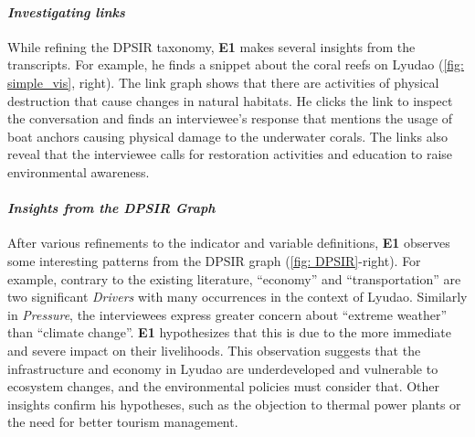 \vspace*{-0.12cm}
\paragraph{\textbf{\textit{Investigating links}}}
While refining the DPSIR taxonomy, \textbf{E1} makes several insights from the transcripts. For example, he finds a snippet about the coral reefs on Lyudao (\autoref{fig: simple_vis}, right). The link graph shows that there are activities of physical destruction that cause changes in natural habitats. He clicks the link to inspect the conversation and finds an interviewee's response that mentions the usage of boat anchors causing physical damage to the underwater corals. The links also reveal that the interviewee calls for restoration activities and education to raise environmental awareness. 

\vspace*{-0.12cm}
\paragraph{\textbf{\textit{Insights from the DPSIR Graph}}}
After various refinements to the indicator and variable definitions, \textbf{E1} observes some interesting patterns from the DPSIR graph (\autoref{fig: DPSIR}-right). For example, contrary to the existing literature, ``economy'' and ``transportation'' are two significant \textit{Drivers} with many occurrences in the context of Lyudao. Similarly in \textit{Pressure}, the interviewees express greater concern about ``extreme weather'' than ``climate change''. \textbf{E1} hypothesizes that this is due to the more immediate and severe impact on their livelihoods. This observation suggests that the infrastructure and economy in Lyudao are underdeveloped and vulnerable to ecosystem changes, and the environmental policies must consider that. Other insights confirm his hypotheses, such as the objection to thermal power plants or the need for better tourism management. 

